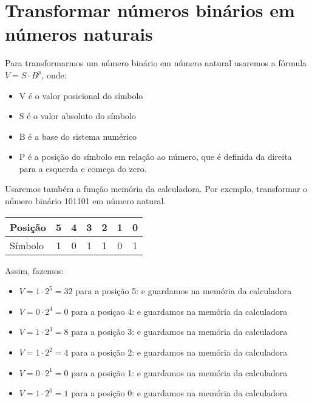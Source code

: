 \documentclass[12pt, openright, a4paper, brazil, openany, oneside]{abntex2}
\begin{document}
\section{Transformar números binários em números naturais}

Para transformarmos um número binário em número natural usaremos a fórmula $ V=S \cdot B^p $, onde:

\begin{itemize}
    \item V é o valor posicional do símbolo
    \item S é o valor absoluto do símbolo
    \item B é a base do sistema numérico
    \item P é a posição do símbolo em relação ao número, que é definida da direita para a esquerda e começa do zero.
\end{itemize}

Usaremos também a função memória da calculadora. Por exemplo, transformar o número binário 101101 em número natural.

\begin{table}[h]
        \centering
        \begin{tabular}{|l|c|c|c|c|c|c|}
            \hline
            Posição & 5 & 4 & 3 & 2 & 1 & 0 \\
            \hline
            Símbolo & 1 & 0 & 1 & 1 & 0 & 1 \\
            \hline
        \end{tabular}
    \end{table}


Assim, fazemos:

\begin{itemize}
    \item $V=1 \cdot 2^5=32 $ para a posição 5: e guardamos na memória da calculadora
    \item $V=0 \cdot 2^4=0 $ para a posiçao 4: e guardamos na memória da calculadora
    \item $V=1 \cdot 2^3=8 $ para a posição 3: e guardamos na memória da calculadora
    \item $V=1 \cdot 2^2=4 $ para a posição 2: e guardamos na memória da calculadora
    \item $V=0 \cdot 2^1=0 $ para a posição 1: e guardamos na memória da calculadora
    \item $V=1 \cdot 2^0=1 $ para a posição 0: e guardamos na memória da calculadora
\end{itemize}
\end{document}

